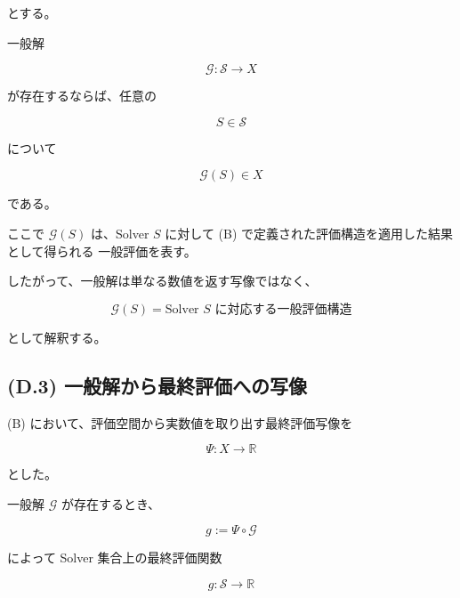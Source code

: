 \documentclass[a4paper,11pt]{article}
\newcommand{\Solver}{\mathcal{S}}
\newcommand{\R}{\mathbb{R}}
\begin{document}
とする。

一般解

\begin{equation}
    \mathcal{G}:
    \Solver\to X
\end{equation}

が存在するならば、任意の

\begin{equation}
    S\in\Solver
\end{equation}

について

\begin{equation}
    \mathcal{G}(S)
    \in X
\end{equation}

である。

ここで $\mathcal{G}(S)$ は、Solver $S$ に対して
(B) で定義された評価構造を適用した結果として得られる
一般評価を表す。

したがって、一般解は単なる数値を返す写像ではなく、

\begin{equation}
    \boxed{
        \mathcal{G}(S)
        =
        \text{Solver $S$ に対応する一般評価構造}
    }
\end{equation}

として解釈する。


\subsection{(D.3) 一般解から最終評価への写像}
\label{subsec:D3}

(B) において、評価空間から実数値を取り出す最終評価写像を

\begin{equation}
    \Psi:
    X
    \longrightarrow
    \R
    \label{eq:D-final-evaluation-map}
\end{equation}

とした。

一般解 $\mathcal{G}$ が存在するとき、

\begin{equation}
    g
    :=
    \Psi\circ\mathcal{G}
    \label{eq:D-final-evaluation}
\end{equation}

によって Solver 集合上の最終評価関数

\begin{equation}
    g:
    \Solver
    \longrightarrow
    \R
\end{equation}
\end{document}
